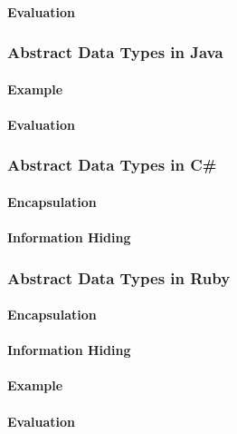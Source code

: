 \paragraph{Evaluation}\label{par:Objective_C_Abstract_Data_Type_Evaluation}

\subsubsection{Abstract Data Types in Java}\label{subsubsec:Abstract_Data_Types_Java}
\paragraph{Example}\label{par:Java_Abstract_Data_Type_Example}
\paragraph{Evaluation}\label{par:Java_Abstract_Data_Type_Evaluation}

\subsubsection{Abstract Data Types in C\#}\label{subsubsec:Abstract_Data_Types_CSharp}
\paragraph{Encapsulation}\label{par:Objective_C_Encapsulation}
\paragraph{Information Hiding}\label{par:Objective_C_Info_Hiding}

\subsubsection{Abstract Data Types in Ruby}\label{subsubsec:Abstract_Data_Types_Ruby}
\paragraph{Encapsulation}\label{par:Ruby_Encapsulation}
\paragraph{Information Hiding}\label{par:Ruby_Info_Hiding}
\paragraph{Example}\label{par:Ruby_Abstract_Data_Type_Example}
\paragraph{Evaluation}\label{par:Ruby_Abstract_Data_Type_Evaluation}
